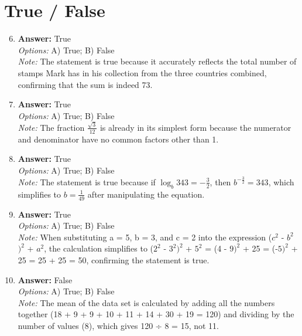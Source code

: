 \documentclass[12pt]{article}
\begin{document}
\section*{True / False}
\begin{enumerate}[label=\arabic*.]
\setcounter{enumi}{5}
\item \textbf{Answer:} True
\\ \textit{Options:} A) True; B) False
\\ \textit{Note:} The statement is true because it accurately reflects the total number of stamps Mark has in his collection from the three countries combined, confirming that the sum is indeed 73.
\item \textbf{Answer:} True
\\ \textit{Options:} A) True; B) False
\\ \textit{Note:} The fraction \( \frac{\sqrt{3}}{12} \) is already in its simplest form because the numerator and denominator have no common factors other than 1.
\item \textbf{Answer:} True
\\ \textit{Options:} A) True; B) False
\\ \textit{Note:} The statement is true because if $\log_{b}343=-\frac{3}{2}$, then $b^{-\frac{3}{2}}=343$, which simplifies to $b = \frac{1}{49}$ after manipulating the equation.
\item \textbf{Answer:} True
\\ \textit{Options:} A) True; B) False
\\ \textit{Note:} When substituting a = 5, b = 3, and c = 2 into the expression ($c^2$ - $b^2$$)^2$ + $a^2$, the calculation simplifies to ($2^2$ - $3^2$$)^2$ + $5^2$ = (4 - $9)^2$ + 25 = (-$5)^2$ + 25 = 25 + 25 = 50, confirming the statement is true.
\item \textbf{Answer:} False
\\ \textit{Options:} A) True; B) False
\\ \textit{Note:} The mean of the data set is calculated by adding all the numbers together (18 + 9 + 9 + 10 + 11 + 14 + 30 + 19 = 120) and dividing by the number of values (8), which gives 120 ÷ 8 = 15, not 11.
\end{enumerate}
\end{document}
